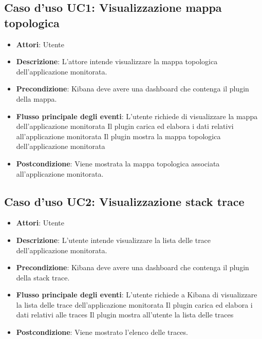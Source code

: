 \subsection{Caso d'uso UC1: Visualizzazione mappa topologica}
\begin{itemize}
\item \textbf{Attori}: Utente
\item \textbf{Descrizione}: L'attore intende visualizzare la mappa topologica dell'applicazione monitorata.
\item \textbf{Precondizione}: Kibana deve avere una dashboard che contenga il plugin della mappa.
\item \textbf{Flusso principale degli eventi}: L'utente richiede di visualizzare la mappa dell'applicazione monitorata 
Il plugin carica ed elabora i dati relativi all'applicazione monitorata
Il plugin mostra la mappa topologica dell'applicazione monitorata
\item \textbf{Postcondizione}: Viene mostrata la mappa topologica associata all'applicazione monitorata.
\end{itemize}
\subsection{Caso d'uso UC2: Visualizzazione stack trace}
\begin{itemize}
\item \textbf{Attori}: Utente
\item \textbf{Descrizione}: L'utente intende visualizzare la lista delle trace dell'applicazione monitorata. 
\item \textbf{Precondizione}: Kibana deve avere una dashboard che contenga il plugin della stack trace.
\item \textbf{Flusso principale degli eventi}: L'utente richiede a Kibana di visualizzare la lista delle trace dell'applicazione monitorata
Il plugin carica ed elabora i dati relativi alle traces
Il plugin mostra all'utente la lista delle traces
\item \textbf{Postcondizione}: Viene mostrato l'elenco delle traces.
\end{itemize}
